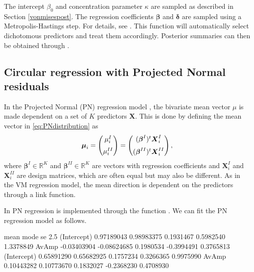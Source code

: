 The intercept \(\beta_0\) and concentration parameter \(\kappa\) are
sampled as described in Section \ref{vonmisespost}. The regression
coefficients \(\boldsymbol{\beta}\) and \(\boldsymbol{\delta}\) are
sampled using a Metropolis-Hastings step. For details, see
\citep{mulder2017bayesian}. This function will automatically select
dichotomous predictors and treat them accordingly. Posterior summaries
can then be obtained through .

\hypertarget{circular-regression-with-projected-normal-residuals}{%
\subsection{Circular regression with Projected Normal
residuals}\label{circular-regression-with-projected-normal-residuals}}

\label{projreg}

In the Projected Normal (PN) regression model \citep{nunez2011bayesian},
the bivariate mean vector \(\mu\) is made dependent on a set of \(K\)
predictors \(\boldsymbol{X}\). This is done by defining the mean vector
in \eqref{eq:PNdistribution} as \begin{equation}
\boldsymbol{\mu}_{i} = \begin{pmatrix}
  \mu_{i}^{I}  \vspace{0.2cm}  \\
\mu_{i}^{II}
 \end{pmatrix}=\begin{pmatrix}
  (\boldsymbol{\beta}^{I})^{t}\boldsymbol{X}_{i}^{I}  \vspace{0.2cm}  \\
  (\boldsymbol{\beta}^{II})^{t}\boldsymbol{X}_{i}^{II} 
 \end{pmatrix},
\end{equation} where \(\boldsymbol{\beta}^{I} \in \mathbb{R}^K\) and
\(\boldsymbol{\beta}^{II} \in \mathbb{R}^K\) are vectors with regression
coefficients and \(\boldsymbol{X}_{i}^{I}\) and
\(\boldsymbol{X}_{i}^{II}\) are design matrices, which are often equal
but may also be different. As in the VM regression model, the mean
direction is dependent on the predictors through a link function.

In  PN regression is implemented through the function
. We can fit the PN regression model as follows.

\begin{CodeChunk}


\begin{CodeOutput}
                   mean        mode        se       2.5%
(Intercept)  0.97189043  0.98983375 0.1931467  0.5982540 1.3378849
AvAmp       -0.03403904 -0.08624685 0.1980534 -0.3994491 0.3765813
(Intercept)  0.65891290  0.65682925 0.1757234  0.3266365 0.9975990
AvAmp        0.10443282  0.10773670 0.1832027 -0.2368230 0.4708930
\end{CodeOutput}
\end{CodeChunk}

